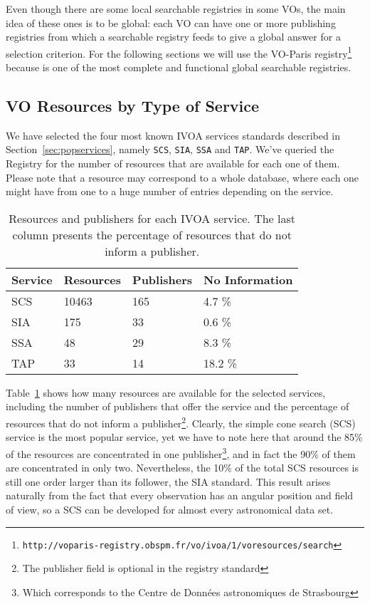 Even though there are some local searchable registries in some VOs, the
main idea of these ones is to be global: each VO can have one or more
publishing registries from which a searchable registry feeds to give
a global answer for a selection criterion. For the following sections
we will use the VO-Paris
registry\footnote{\texttt{http://voparis-registry.obspm.fr/vo/ivoa/1/voresources/search}}
because is one of the most complete and functional global searchable registries.

\subsection{VO Resources by Type of Service}

We have selected the four most known IVOA services standards described in Section~\ref{sec:popservices}, namely
\verb+SCS+, \verb+SIA+, \verb+SSA+ and \verb+TAP+. We've queried the Registry for the number of resources 
that are available for each one of them. Please note that a resource may correspond to a whole database, where
each one might have from one to a huge number of entries depending on the service. 

\begin{table}
\begin{center}
\begin{tabular}{|l|l|l|l|}
\hline
\textbf{Service} & \textbf{Resources} & \textbf{Publishers} & \textbf{No
Information} \\
\hline
SCS  &  10463 & 165 & 4.7 \% \\
SIA  &  175 & 33 & 0.6 \% \\
SSA  &  48  & 29 & 8.3 \% \\
TAP  &  33  & 14 & 18.2 \% \\
\hline
\end{tabular}
\label{tab:serviceRanking}
\caption{Resources and publishers for each IVOA service. The last column
presents the percentage of resources that do not inform a publisher.}
\end{center}
\end{table}

Table~\ref{tab:serviceRanking} shows how many resources are available for the
selected services, including the number of publishers that offer the service
and the percentage of resources that do not inform a publisher\footnote{The
publisher field is optional in the registry standard}. Clearly, the simple
cone search (SCS) service is the most popular service, yet we have to note
here that around the 85\% of the resources are concentrated in one publisher\footnote{Which corresponds to the Centre de Données astronomiques de Strasbourg},
and in fact the 90\% of them are concentrated in only two. Nevertheless, the 
10\% of the total SCS resources is still one order larger than its follower, 
the SIA standard. This result arises naturally from the fact that every
observation has an angular position and field of view, so a SCS can be 
developed for almost every astronomical data set.

